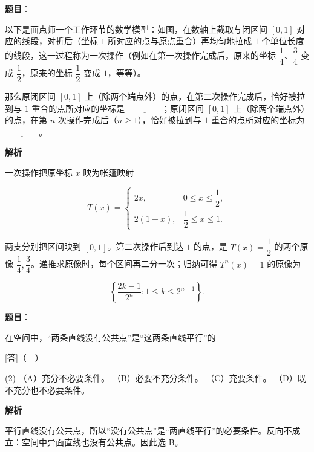 \begin{answer}

\textbf{题目}：

以下是面点师一个工作环节的数学模型：如图，在数轴上截取与闭区间 $[0,1]$ 对应的线段，对折后（坐标 $1$ 所对应的点与原点重合）再均匀地拉成 $1$ 个单位长度的线段，这一过程称为一次操作（例如在第一次操作完成后，原来的坐标 $\dfrac14$、$\dfrac34$ 变成 $\dfrac12$，原来的坐标 $\dfrac12$ 变成 $1$，等等）。

那么原闭区间 $[0,1]$ 上（除两个端点外）的点，在第二次操作完成后，恰好被拉到与 $1$ 重合的点所对应的坐标是 $\underline{\qquad\qquad}$；原闭区间 $[0,1]$ 上（除两个端点外）的点，在第 $n$ 次操作完成后（$n\ge 1$），恰好被拉到与 $1$ 重合的点所对应的坐标为 $\underline{\qquad\qquad}$。
\nopagebreak[4]
\begin{center}\end{center}
\nopagebreak[4]
\textbf{解析}

一次操作把原坐标 $x$ 映为帐篷映射

\nopagebreak[4]
\[
T(x)=\begin{cases}2x,&0\le x\le\dfrac12,\\2(1-x),&\dfrac12\le x\le1.\end{cases}
\]

两支分别把区间映到 $[0,1]$。第二次操作后到达 $1$ 的点，是 $T(x)=\dfrac12$ 的两个原像 $\dfrac14,\dfrac34$。递推求原像时，每个区间再二分一次；归纳可得 $T^n(x)=1$ 的原像为

\nopagebreak[4]
\[
\left\{\frac{2k-1}{2^n}:1\le k\le2^{n-1}\right\}.
\]


\end{answer}
\begin{answer}

\textbf{题目}：

在空间中，“两条直线没有公共点”是“这两条直线平行”的

[答]（　）

\begin{gkopts}(2)
\task （A）充分不必要条件。
\task （B）必要不充分条件。
\task （C）充要条件。
\task （D）既不充分也不必要条件。
\end{gkopts}

\textbf{解析}

平行直线没有公共点，所以“没有公共点”是“两直线平行”的必要条件。反向不成立：空间中异面直线也没有公共点。因此选 B。


\end{answer}
